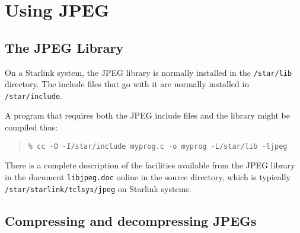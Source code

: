 \stardocabstract
\newpage


\section{\label{using_jpeg}Using JPEG}

\subsection{\label{the_jpeg_library}The JPEG Library}

On a Starlink system, the JPEG library is normally installed in the
{\tt{/star/lib}} directory.  The include files that go with it are
normally installed in {\tt{/star/include}}.

A program that requires both the JPEG include files and the library
might be compiled thus:

\begin{quote}
{\tt \% cc -O -I/star/include myprog.c -o myprog -L/star/lib -ljpeg}
\end{quote}

There is a complete description of the facilities available from the
JPEG library in the document {\tt{libjpeg.doc}} online in the source
directory, which is typically {\tt{/star/starlink/tclsys/jpeg}} on
Starlink systems.

\subsection{\label{compressing_and_decompressing_jpegs}Compressing and decompressing JPEGs}

